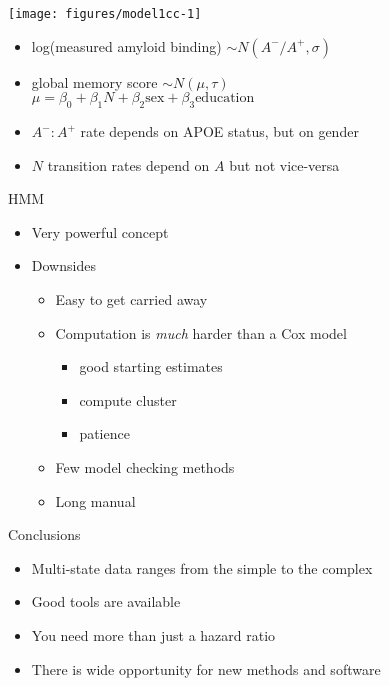 \begin{frame}
\begin{knitrout}
\color{fgcolor}
\texttt{[image: figures/model1cc-1]} 

\end{knitrout}
\end{frame}
 
\begin{frame}
  \begin{itemize}
    \item log(measured amyloid binding) $ \sim N(A^-/A^+, \sigma)$
    \item global memory score $\sim N(\mu, \tau)$ \\
      $\mu = \beta_0 + \beta_1N + \beta_2\mbox{sex} + \beta_3\mbox{education}$
    \item $A^-:A^+$ rate depends on APOE status, but on gender
    \item $N$ transition rates depend on $A$ but not vice-versa
  \end{itemize}
\end{frame}

\begin{frame}
\end{frame}

\begin{frame}
\end{frame}

\begin{frame}
\end{frame}

\begin{frame}{HMM}
  \begin{itemize}
    \item Very powerful concept
    \item Downsides
      \begin{itemize}
        \item Easy to get carried away
        \item Computation is \emph{much} harder than a Cox model
          \begin{itemize}
            \item good starting estimates
            \item compute cluster
            \item patience
          \end{itemize}
        \item Few model checking methods
        \item Long manual
      \end{itemize}
  \end{itemize}
\end{frame}

\begin{frame}{Conclusions}
  \begin{itemize}
    \item Multi-state data ranges from the simple to the complex
    \item Good tools are available
    \item You need more than just a hazard ratio
    \item There is wide opportunity for new methods and software
  \end{itemize}
\end{frame}

          
